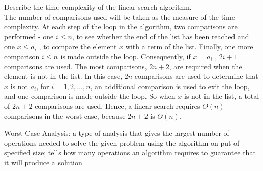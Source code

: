 \documentclass[12pt]{article}
\begin{document}
\begin{example} Describe the time complexity of the linear search algorithm. \\ The number of comparisons used will be taken as the measure of the time complexity. At each step of the loop in the algorithm, two comparisons are performed - one $i \leq n$, to see whether the end of the list has been reached and one $x \leq a_i$ , to compare the element $x$ with a term of the list. Finally, one more comparison $i \leq n$ is made outside the loop. Consequently, if $x = a_i$ , $2i + 1$ comparisons are used. The most comparisons, $2n + 2$, are required when the element is not in the list. In this case, $2n$ comparisons are used to determine that $x$ is not $a_i$, for $i = 1, 2, \dots, n$, an additional comparison is used to exit the loop, and one comparison is made outside the loop. So when $x$ is not in the list, a total of $2n + 2$ comparisons are used. Hence, a linear search requires $\Theta(n)$ comparisons in the worst case, because $2n + 2$ is $\Theta(n)$. \end{example}
\begin{definition} Worst-Case Analysis: a type of analysis that gives the largest number of operations needed to solve the given problem using the algorithm on put of specified size; tells how many operations an algorithm requires to guarantee that it will produce a solution \end{definition}
\end{document}
